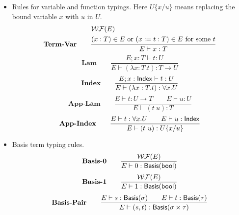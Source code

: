 \begin{itemize}
    \item Rules for variable and function typings. Here $U\{x/u\}$ means replacing the bound variable $x$ with $u$ in $U$.
    \[
        \textbf{Term-Var} \qquad
        \frac{
            \begin{aligned}
                & \mathcal{WF}(E) \\
                & (x:T) \in E \text{ or } (x := t : T) \in E \text{ for some $t$}
            \end{aligned}
        }
        {E \vdash x : T}
    \]
    \[
        \textbf{Lam} \qquad
        \frac{E; x : T \vdash t : U}{E \vdash (\lambda x : T . t) : T \to U}
    \]
    \[
        \textbf{Index} \qquad
        \frac{E; x : \mathsf{Index} \vdash t : U}{E \vdash (\lambda x : T.t) : \forall x.U}
    \]
    \[
        \textbf{App-Lam} \qquad
        \frac{E \vdash t:U \to T \qquad E \vdash u:U}{E \vdash (t\ u):T}
    \]
    \[
        \textbf{App-Index} \qquad
        \frac{E \vdash t:\forall x.U \qquad E \vdash u : \mathsf{Index}}{E \vdash (t\ u):U\{x/u\}}
    \]
    
    \item Basis term typing rules. 
    \[  \textbf{Basis-0} \qquad
        \frac{\mathcal{WF}(E)}{E \vdash 0 : \mathsf{Basis}(\mathsf{bool})}
    \]
    \[  \textbf{Basis-1} \qquad
        \frac{\mathcal{WF}(E)}{E \vdash 1 : \mathsf{Basis}(\mathsf{bool})}
    \]
    \[
        \textbf{Basis-Pair} \qquad
        \frac{E\vdash s : \mathsf{Basis}(\sigma) \qquad E\vdash t : \mathsf{Basis}(\tau)} {E\vdash (s, t) : \mathsf{Basis}(\sigma \times \tau)}
    \]



\end{itemize}
